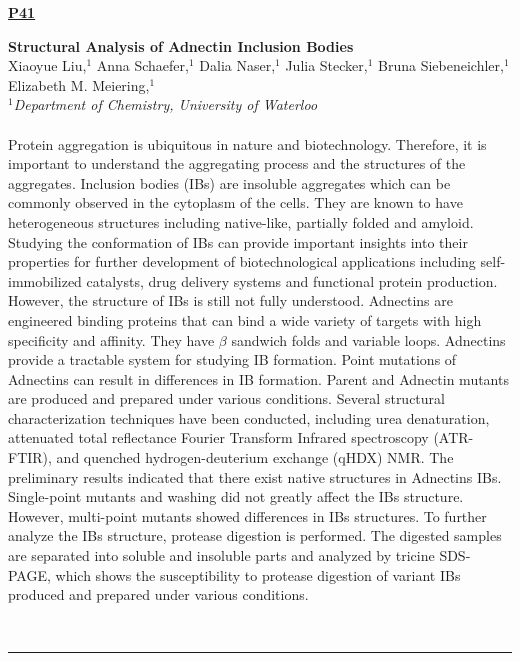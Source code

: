 \documentclass[titlepage,oneside,openany,10pt]{book}
\newenvironment{posterabs}[4] %
        {
	\begin{flushright}
                \underline{\textbf{#4}}
        \end{flushright}
        \textbf{#1}\\%
        #2\\%
        \textit{#3}\\\\%
        }
        {
        \\
        \noindent\rule{15cm}{0.5pt}%
        }
\begin{document}
\newpage

\begin{posterabs}
    {Structural Analysis of Adnectin Inclusion Bodies}
    {Xiaoyue Liu,$^{1}$ Anna Schaefer,$^{1}$ Dalia Naser,$^{1}$ Julia Stecker,$^{1}$ Bruna Siebeneichler,$^{1}$ Elizabeth M. Meiering,$^{1}$}
    {
    $^1$Department of Chemistry, University of Waterloo
    }
    {P41}
    Protein aggregation is ubiquitous in nature and biotechnology. Therefore, it is important to understand the aggregating process and the structures of the aggregates. Inclusion bodies (IBs) are insoluble aggregates which can be commonly observed in the cytoplasm of the cells. They are known to have heterogeneous structures including native-like, partially folded and amyloid. Studying the conformation of IBs can provide important insights into their properties for further development of biotechnological applications including self-immobilized catalysts, drug delivery systems and functional protein production. However, the structure of IBs is still not fully understood. Adnectins are engineered binding proteins that can bind a wide variety of targets with high specificity and affinity. They have $\beta$ sandwich folds and variable loops. Adnectins provide a tractable system for studying IB formation. Point mutations of Adnectins can result in differences in IB formation. Parent and Adnectin mutants are produced and prepared under various conditions. Several structural characterization techniques have been conducted, including urea denaturation, attenuated total reflectance Fourier Transform Infrared spectroscopy (ATR-FTIR), and quenched hydrogen-deuterium exchange (qHDX) NMR. The preliminary results indicated that there exist native structures in Adnectins IBs. Single-point mutants and washing did not greatly affect the IBs structure. However, multi-point mutants showed differences in IBs structures. To further analyze the IBs structure, protease digestion is performed. The digested samples are separated into soluble and insoluble parts and analyzed by tricine SDS-PAGE, which shows the susceptibility to protease digestion of variant IBs produced and prepared under various conditions.
    \label{LiuX}
\end{posterabs}

\vspace{1cm}
\end{document}
